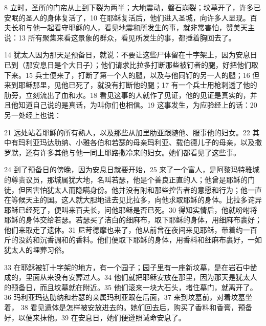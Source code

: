 8 立时，圣所的门帘从上到下裂为两半；大地震动，磐石崩裂；坟墓开了，许多已安眠的圣人的身体复活了，10 在耶稣复活后，他们进入圣城，向许多人显现。百夫长和与他一起看守耶稣的人，看见地震和所发生的事，就非常害怕，赞美天主说：13 所有聚集来看这景象的群众，看见所发生的事，都捶着胸回去了。\par

14 犹太人因为那天是预备日，就说：不要让这些尸体留在十字架上，因为安息日已到（那安息日是个大日子）；他们请求比拉多打断那些被钉者的腿，好把他们取下来。15 兵士便来了，打断了第一个人的腿，以及与他同钉的另一人的腿；16 但来到耶稣那里，见他已死了，就没有打断他的腿；17 有一个兵士用枪刺透了他的肋旁，立刻流出了血和水。18 看见这事的人就作了见证，他的见证是真实的，并且他知道自己说的是真话，为叫你们也相信。19 这事发生，为应验经上的话：20 另一处经上也说：\par

21 远处站着耶稣的所有熟人，以及那些从加里肋亚跟随他、服事他的妇女。22 其中有玛利亚玛达肋纳、小雅各伯和若瑟的母亲玛利亚、载伯德儿子的母亲，以及撒罗默，还有许多其他与他一同上耶路撒冷来的妇女。她们都看见了这些事。\par

24 到了预备日的傍晚，因为安息日就要开始，25 来了一个富人，是阿黎玛特雅城的尊贵议员，那城属犹大地，名叫若瑟，他是个善良正直的人；他曾是耶稣的门徒，但因害怕犹太人而隐瞒身份。他并没有附和那些控告者的意愿和行为；他一直在等候天主的国。这人就大胆地进去见比拉多，向他求取耶稣的身体。比拉多诧异耶稣已经死了，便叫来百夫长，问他耶稣是否已死。30 得知实情后，他就吩咐将耶稣的身体交给若瑟。若瑟买了洁白的细麻布，取下耶稣的身体，用细麻布裹好；他们来取走了遗体。31 尼苛德摩也来了，他从前曾在夜间来见耶稣，带着约一百斤的没药和沉香调和的香料。他们便取下耶稣的身体，用香料和细麻布裹好，一如犹太人的埋葬习俗。\par

33 在耶稣被钉十字架的地方，有一个园子；园子里有一座新坟墓，是在岩石中凿成的，里面从来没有安葬过人。34 他们就把耶稣安放在那里，因为那天是犹太人的预备日，而且坟墓就在附近。35 他们滚来一块大石头，堵住墓门，就离开了。36 玛利亚玛达肋纳和若瑟的亲属玛利亚跟在后面，37 来到坟墓前，对着坟墓坐着， 38 看见遗体是怎样被安放进去的。她们回去后，购买了香料和香膏，预备好，以便来抹他。39 在安息日，她们便遵照诫命安息了。\par

